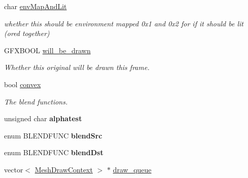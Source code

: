 \begin{DoxyCompactItemize}
\item 
char \hyperlink{classMesh_aaa541c171c8681a0fa5f62afa9d65e11}{env\+Map\+And\+Lit}\hypertarget{classMesh_aaa541c171c8681a0fa5f62afa9d65e11}{}\label{classMesh_aaa541c171c8681a0fa5f62afa9d65e11}

\begin{DoxyCompactList}\small\item\em whether this should be environment mapped 0x1 and 0x2 for if it should be lit (ored together) \end{DoxyCompactList}\item 
G\+F\+X\+B\+O\+OL \hyperlink{classMesh_af682d73e059e78d2696c45ed78bbbf78}{will\+\_\+be\+\_\+drawn}\hypertarget{classMesh_af682d73e059e78d2696c45ed78bbbf78}{}\label{classMesh_af682d73e059e78d2696c45ed78bbbf78}

\begin{DoxyCompactList}\small\item\em Whether this original will be drawn this frame. \end{DoxyCompactList}\item 
bool \hyperlink{classMesh_a4e1e49439b24fea72ea885220003866b}{convex}\hypertarget{classMesh_a4e1e49439b24fea72ea885220003866b}{}\label{classMesh_a4e1e49439b24fea72ea885220003866b}

\begin{DoxyCompactList}\small\item\em The blend functions. \end{DoxyCompactList}\item 
unsigned char {\bfseries alphatest}\hypertarget{classMesh_a8038d48dda04c105e1c0be8a4d7de431}{}\label{classMesh_a8038d48dda04c105e1c0be8a4d7de431}

\item 
enum B\+L\+E\+N\+D\+F\+U\+NC {\bfseries blend\+Src}\hypertarget{classMesh_a1dc901bcd39faff4f5c116152bfbe68a}{}\label{classMesh_a1dc901bcd39faff4f5c116152bfbe68a}

\item 
enum B\+L\+E\+N\+D\+F\+U\+NC {\bfseries blend\+Dst}\hypertarget{classMesh_a591c751e79748318cbbd4ccbbdef9c31}{}\label{classMesh_a591c751e79748318cbbd4ccbbdef9c31}

\item 
vector$<$ \hyperlink{structMeshDrawContext}{Mesh\+Draw\+Context} $>$ $\ast$ \hyperlink{classMesh_a7e240909592627ef7074081906b9039f}{draw\+\_\+queue}\hypertarget{classMesh_a7e240909592627ef7074081906b9039f}{}\label{classMesh_a7e240909592627ef7074081906b9039f}


\end{DoxyCompactItemize}
